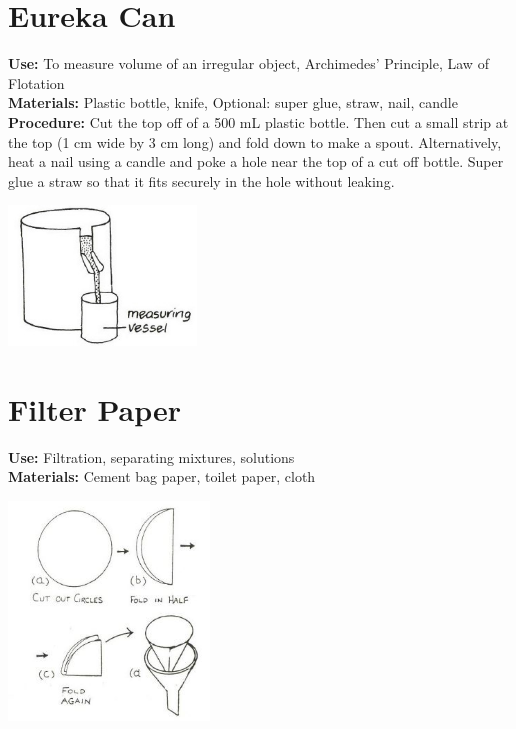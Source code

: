 \begin{multicols}{2}
\section{Eureka Can} 
\label{sec:eureka-can}
\vspace{-10pt}
\textbf{Use:} To measure volume of an irregular object, Archimedes' Principle, Law of Flotation\\
\textbf{Materials:} Plastic bottle, knife, Optional: super glue, straw, nail, candle\\
\textbf{Procedure:} Cut the top off of a 500 mL plastic bottle. Then cut a small strip at the top (1 cm wide by 3 cm long) and fold down to make a spout. Alternatively, heat a nail using a candle and poke a hole near the top of a cut off bottle. Super glue a straw so that it fits securely in the hole without leaking.
\begin{center}
\includegraphics[width=5cm]{./img/vso/eureka-can.jpg}
\end{center}

\columnbreak

\section{Filter Paper} 
\label{sec:filter-paper}
\vspace{-10pt}
\textbf{Use:} Filtration, separating mixtures, solutions\\
\textbf{Materials:} Cement bag paper, toilet paper, cloth
\begin{center}
\includegraphics[width=0.4\textwidth]{./img/source/filter-paper.jpg}
\end{center}


\end{multicols}
